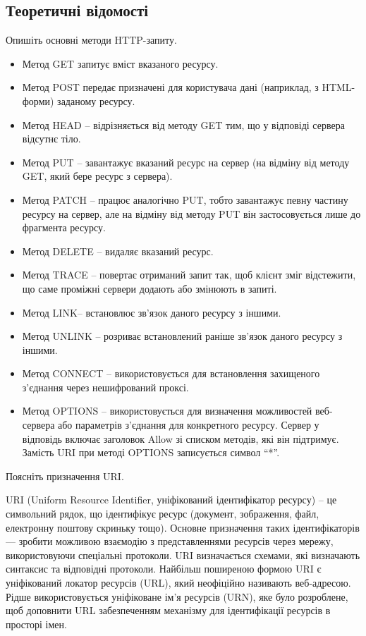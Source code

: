 \documentclass{article}
\begin{document}
\begin{normalsize}
\section*{Теоретичні відомості}
Опишіть основні методи HTTP-запиту. 
\begin{itemize}
	\item Метод GET запитує вміст вказаного ресурсу.  
	\item Метод POST передає призначені для користувача дані (наприклад, з HTML-форми) заданому ресурсу.
	\item Метод HEAD – відрізняється від методу GET тим, що у відповіді сервера відсутнє тіло.
	\item Метод PUT – завантажує вказаний ресурс на сервер (на відміну від методу GET, який бере ресурс з сервера). 
	\item Метод PATCH – працює аналогічно PUT, тобто завантажує певну частину ресурсу на сервер, але на відміну від методу PUT він застосовується лише до фрагмента ресурсу. 
	\item Метод DELETE – видаляє вказаний ресурс. 
	\item Метод TRACE – повертає отриманий запит так, щоб клієнт зміг відстежити, що саме проміжні сервери додають або змінюють в запиті.
	\item Метод LINK– встановлює зв'язок даного ресурсу з іншими. 
	\item Метод UNLINK – розриває встановлений раніше зв'язок даного ресурсу з іншими.
	\item Метод CONNECT – використовується для встановлення захищеного з'єднання через нешифрований проксі. 
	\item Метод OPTIONS – використовується для визначення можливостей веб-сервера або параметрів з’єднання для конкретного ресурсу. Сервер у відповідь включає заголовок Allow зі списком методів, які він підтримує. Замість URI при методі OPTIONS записується символ “*”.
\end{itemize}

Поясніть призначення URI.

URI (Uniform Resource Identifier, уніфікований ідентифікатор ресурсу) –
це символьний рядок, що ідентифікує ресурс (документ, зображення, файл,
електронну поштову скриньку тощо). Основне призначення таких
ідентифікаторів — зробити можливою взаємодію з представленнями ресурсів
через мережу, використовуючи спеціальні протоколи. URI визначається
схемами, які визначають синтаксис та відповідні протоколи. Найбільш
поширеною формою URI є уніфікований локатор ресурсів (URL), який
неофіційно називають веб-адресою. Рідше використовується уніфіковане ім'я
ресурсів (URN), яке було розроблене, щоб доповнити URL забезпеченням
механізму для ідентифікації ресурсів в просторі імен.


\end{normalsize}
\end{document}
